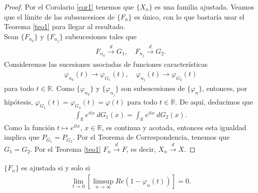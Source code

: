 \begin{proof}
    Por el Corolario \ref{cor1} tenemos que $\{X_n\}$ es una familia ajustada. Veamos que el límite de las subssucesioes de $\{F_n\}$ es único, con lo que bastaría usar el Teorema \ref{teo1} para llegar al resultado.
    \\
    \newline
    Sean $\{F_{n_k}\}$ y $\{F_{n_j}\}$ subsucesiones tales que
    \begin{align*}
        F_{n_k} \xrightarrow[]{d} G_1, \quad F_{n_j} \xrightarrow[]{d} G_2.
    \end{align*}
    Consideremos las sucesiones asociadas de funciones características
    \begin{align*}
        \varphi_{n_k}(t) \longrightarrow \varphi_{G_1}(t), \quad \varphi_{n_j}(t) \longrightarrow \varphi_{G_2}(t)
    \end{align*}
    para todo $t \in \mathbb{R}$. Como $\{\varphi_{n_k}\}$ y $\{\varphi_{n_j}\}$ son subsucesiones de $\{\varphi_n\}$, entonces, por hipótesis, $\varphi_{G_1}(t) = \varphi_{G_2}(t) = \varphi(t)$ para todo $t \in \mathbb{R}$. De aquí, deducimos que
    \begin{align*}
        \int_{\mathbb{R}} e^{itx} \ dG_1(x) = \int_{\mathbb{R}} e^{itx} \ dG_2(x).
    \end{align*}
    Como la función $t \longmapsto e^{itx}$, $x \in \mathbb{R}$, es continua y acotada, entonces esta igualdad implica que $P_{G_1} = P_{G_2}$. Por el Teorema de Correspondencia, tenemos que $G_1 = G_2$. Por  el Teorema \ref{teo1} $F_n \xrightarrow[]{d} F$, es decir, $X_n \xrightarrow[]{d} X$.
\end{proof}

\begin{teo}
    $\{F_n\}$ es ajustada si y solo si
    \begin{align*}
        \lim_{t \to 0} \left[ \limsup_{n \to \infty} Re(1 - \varphi_n(t)) \right] = 0.
    \end{align*}
\end{teo}

